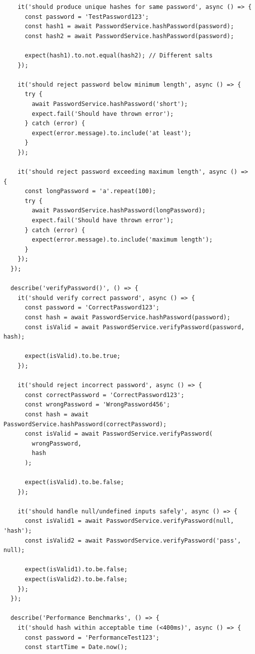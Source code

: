 \documentclass[12pt,a4paper]{article}
\begin{document}
\begin{tcolorbox}[colback=primaryblue!5, colframe=primaryblue, boxrule=1pt, arc=3pt, left=10pt, right=10pt, top=8pt, bottom=8pt]
\begin{verbatim}
    it('should produce unique hashes for same password', async () => {
      const password = 'TestPassword123';
      const hash1 = await PasswordService.hashPassword(password);
      const hash2 = await PasswordService.hashPassword(password);
      
      expect(hash1).to.not.equal(hash2); // Different salts
    });
    
    it('should reject password below minimum length', async () => {
      try {
        await PasswordService.hashPassword('short');
        expect.fail('Should have thrown error');
      } catch (error) {
        expect(error.message).to.include('at least');
      }
    });
    
    it('should reject password exceeding maximum length', async () => {
      const longPassword = 'a'.repeat(100);
      try {
        await PasswordService.hashPassword(longPassword);
        expect.fail('Should have thrown error');
      } catch (error) {
        expect(error.message).to.include('maximum length');
      }
    });
  });
  
  describe('verifyPassword()', () => {
    it('should verify correct password', async () => {
      const password = 'CorrectPassword123';
      const hash = await PasswordService.hashPassword(password);
      const isValid = await PasswordService.verifyPassword(password, hash);
      
      expect(isValid).to.be.true;
    });
    
    it('should reject incorrect password', async () => {
      const correctPassword = 'CorrectPassword123';
      const wrongPassword = 'WrongPassword456';
      const hash = await PasswordService.hashPassword(correctPassword);
      const isValid = await PasswordService.verifyPassword(
        wrongPassword, 
        hash
      );
      
      expect(isValid).to.be.false;
    });
    
    it('should handle null/undefined inputs safely', async () => {
      const isValid1 = await PasswordService.verifyPassword(null, 'hash');
      const isValid2 = await PasswordService.verifyPassword('pass', null);
      
      expect(isValid1).to.be.false;
      expect(isValid2).to.be.false;
    });
  });
  
  describe('Performance Benchmarks', () => {
    it('should hash within acceptable time (<400ms)', async () => {
      const password = 'PerformanceTest123';
      const startTime = Date.now();
      

\end{verbatim}
\end{tcolorbox}
\end{document}
